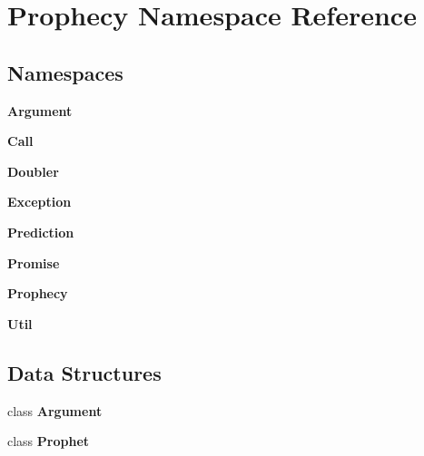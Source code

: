 \section{Prophecy Namespace Reference}
\label{namespace_prophecy}
\subsection*{Namespaces}
\begin{DoxyCompactItemize}
\item 
 {\bf Argument}
\item 
 {\bf Call}
\item 
 {\bf Doubler}
\item 
 {\bf Exception}
\item 
 {\bf Prediction}
\item 
 {\bf Promise}
\item 
 {\bf Prophecy}
\item 
 {\bf Util}
\end{DoxyCompactItemize}
\subsection*{Data Structures}
\begin{DoxyCompactItemize}
\item 
class {\bf Argument}
\item 
class {\bf Prophet}
\end{DoxyCompactItemize}
